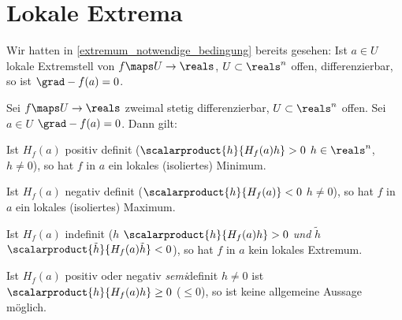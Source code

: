 \section{Lokale Extrema}
Wir hatten in \ref{extremum_notwendige_bedingung} bereits gesehen: Ist \( a\in U \) lokale Extremstell von \( f\maps U\to \reals \), \( U\subset \reals^n \) offen, differenzierbar, so ist \( \grad-{f}(a)=0 \).
\begin{satz}\label{hinreichende_bedingung_isoliertes_extremum}
  Sei \( f\maps U\to \reals \) zweimal stetig differenzierbar, \( U\subset \reals^n \) offen. Sei \( a\in U \) \sd \( \grad-{f}(a)=0 \). Dann gilt:
  \begin{eigenschaftenenumerate}
    \item\label{hinreichende_bedingung_isoliertes_minimum} Ist \( H_f(a) \) positiv definit (\dh \( \scalarproduct{h}{H_f(a)h}>0 \) \tforall \( h\in \reals^n \), \( h\neq 0 \)), so hat \( f \) in \( a \) ein lokales (isoliertes) Minimum.
    \item\label{hinreichende_bedingung_isoliertes_maximum} Ist \( H_f(a) \) negativ definit (\dh \( \scalarproduct{h}{H_f(a)}<0 \) \tforall \( h\neq 0 \)), so hat \( f \) in \( a \) ein lokales (isoliertes) Maximum.
    \item\label{hinreichende_bedingung_kein_extremum} Ist \( H_f(a) \) indefinit (\dh \texists  \( h \) \sd \( \scalarproduct{h}{H_f(a)h}>0 \) \emph{und} \texists \( \tilde{h} \) \sd \( \scalarproduct{\tilde{h}}{H_f(a)\tilde{h}}<0 \)), so hat \( f \) in \( a \) kein lokales Extremum.
  \end{eigenschaftenenumerate}
\end{satz}
\begin{bemerkung*}
  Ist \( H_f(a) \) positiv oder negativ \emph{semi}definit \sd \tforall \( h\neq 0 \) ist \( \scalarproduct{h}{H_f(a)h}\geq 0 \) (\bzw \( \leq 0 \)), so ist keine allgemeine Aussage möglich.
\end{bemerkung*}
